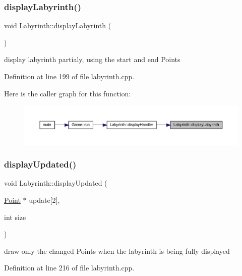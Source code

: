 \subsubsection{\texorpdfstring{displayLabyrinth()}{displayLabyrinth()}}
{\footnotesize\ttfamily void Labyrinth\+::display\+Labyrinth (\begin{DoxyParamCaption}{ }\end{DoxyParamCaption})\hspace{0.3cm}{\ttfamily [private]}}

display labyrinth partialy, using the start and end Points 

Definition at line 199 of file labyrinth.\+cpp.

Here is the caller graph for this function\+:
\nopagebreak
\begin{figure}[H]
\begin{center}
\leavevmode
\includegraphics[width=350pt]{class_labyrinth_a676e53a7bced45343af8307eae2ba2d0_icgraph}
\end{center}
\end{figure}
\mbox{\label{class_labyrinth_a86210707e3b4be4faaa9bd1f86429124}} 
\subsubsection{\texorpdfstring{displayUpdated()}{displayUpdated()}}
{\footnotesize\ttfamily void Labyrinth\+::display\+Updated (\begin{DoxyParamCaption}\item[{\mbox{\hyperlink{common_8h_aa9cfdb80b4ca12013a2de8a3b9b97981}{Point}} $\ast$}]{update\mbox{[}2\mbox{]},  }\item[{int}]{size }\end{DoxyParamCaption})\hspace{0.3cm}{\ttfamily [private]}}

draw only the changed Points when the labyrinth is being fully displayed 

Definition at line 216 of file labyrinth.\+cpp.

